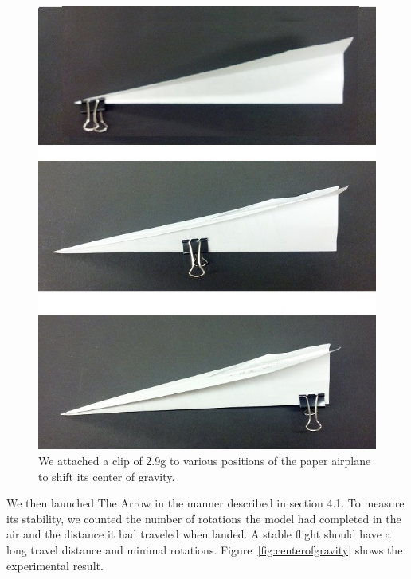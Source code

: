 \begin{figure}[hl]
	\centering
		\includegraphics[scale=0.5]{figures/clip.png}
		\caption{We attached a clip of 2.9g to various positions of the paper airplane to shift its center of gravity.}
	\label{fig:clip}
\end{figure}

We then launched The Arrow in the manner described in section 4.1. To measure its stability, we counted the number of rotations the model had completed in the air and the distance it had traveled when landed. A stable flight should have a long travel distance and minimal rotations.
Figure~\ref{fig:centerofgravity} shows the experimental result. 



